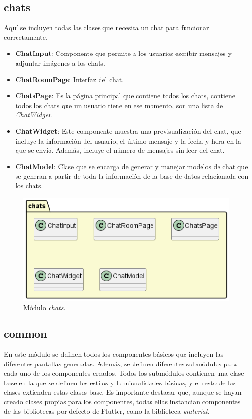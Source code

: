 \documentclass[a4paper, 12pt]{article}
\begin{document}
\subsection*{chats}

Aquí se incluyen todas las clases que necesita un chat para funcionar correctamente.
\begin{itemize}[noitemsep]
	\item \textbf{ChatInput}: Componente que permite a los usuarios escribir mensajes y adjuntar imágenes a los chats.
	\item \textbf{ChatRoomPage}: Interfaz del chat.
	\item \textbf{ChatsPage}:  Es la página principal que contiene todos los chats, contiene todos los chats que un usuario tiene en ese momento, son una lista de \textit{ChatWidget}.
	\item \textbf{ChatWidget}: Este componente muestra una previsualización del chat, que incluye la información del usuario, el último mensaje y la fecha y hora en la que se envió. Además, incluye el número de mensajes sin leer del chat.
	\item \textbf{ChatModel}: Clase que se encarga de generar y manejar modelos de chat que se generan a partir de toda la información de la base de datos relacionada con los chats.
\end{itemize}

\begin{figure}[H]
	\begin{center}
		{\includegraphics[width=0.7\linewidth]{diagram/Chats.png}\par}
		\caption{Módulo \textit{chats}.}
	\end{center}
\end{figure}


\subsection*{common}

En este módulo se definen todos los componentes básicos que incluyen las diferentes pantallas generadas. Además, se definen diferentes submódulos para cada uno de los componentes creados. Todos los submódulos contienen una clase base en la que se definen los estilos y funcionalidades básicas, y el resto de las clases extienden estas clases base. Es importante destacar que, aunque se hayan creado clases propias para los componentes, todas ellas instancian componentes de las bibliotecas por defecto de Flutter, como la biblioteca \textit{material}.
\end{document}
